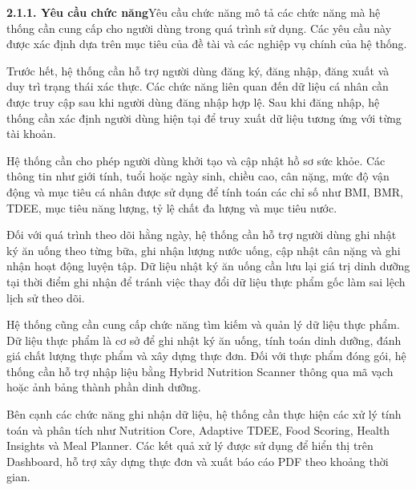 \textbf{2.1.1. Yêu cầu chức năng}Yêu cầu chức năng mô tả các chức năng mà hệ thống cần cung cấp cho người dùng trong quá trình sử dụng. Các yêu cầu này được xác định dựa trên mục tiêu của đề tài và các nghiệp vụ chính của hệ thống.

Trước hết, hệ thống cần hỗ trợ người dùng đăng ký, đăng nhập, đăng xuất và duy trì trạng thái xác thực. Các chức năng liên quan đến dữ liệu cá nhân cần được truy cập sau khi người dùng đăng nhập hợp lệ. Sau khi đăng nhập, hệ thống cần xác định người dùng hiện tại để truy xuất dữ liệu tương ứng với từng tài khoản.

Hệ thống cần cho phép người dùng khởi tạo và cập nhật hồ sơ sức khỏe. Các thông tin như giới tính, tuổi hoặc ngày sinh, chiều cao, cân nặng, mức độ vận động và mục tiêu cá nhân được sử dụng để tính toán các chỉ số như BMI, BMR, TDEE, mục tiêu năng lượng, tỷ lệ chất đa lượng và mục tiêu nước.

Đối với quá trình theo dõi hằng ngày, hệ thống cần hỗ trợ người dùng ghi nhật ký ăn uống theo từng bữa, ghi nhận lượng nước uống, cập nhật cân nặng và ghi nhận hoạt động luyện tập. Dữ liệu nhật ký ăn uống cần lưu lại giá trị dinh dưỡng tại thời điểm ghi nhận để tránh việc thay đổi dữ liệu thực phẩm gốc làm sai lệch lịch sử theo dõi.

Hệ thống cũng cần cung cấp chức năng tìm kiếm và quản lý dữ liệu thực phẩm. Dữ liệu thực phẩm là cơ sở để ghi nhật ký ăn uống, tính toán dinh dưỡng, đánh giá chất lượng thực phẩm và xây dựng thực đơn. Đối với thực phẩm đóng gói, hệ thống cần hỗ trợ nhập liệu bằng Hybrid Nutrition Scanner thông qua mã vạch hoặc ảnh bảng thành phần dinh dưỡng.

Bên cạnh các chức năng ghi nhận dữ liệu, hệ thống cần thực hiện các xử lý tính toán và phân tích như Nutrition Core, Adaptive TDEE, Food Scoring, Health Insights và Meal Planner. Các kết quả xử lý được sử dụng để hiển thị trên Dashboard, hỗ trợ xây dựng thực đơn và xuất báo cáo PDF theo khoảng thời gian.

